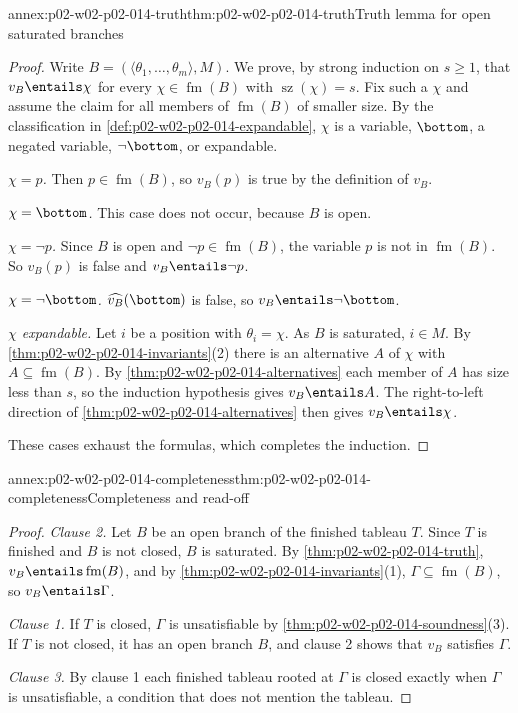 \begin{annexitem}{annex:p02-w02-p02-014-truth}{thm:p02-w02-p02-014-truth}{Truth lemma for open saturated branches}
\begin{proof}
Write \(B=(\langle\theta_1,\ldots,\theta_m\rangle,M)\).  We prove, by strong
induction on \(s\geq1\), that \(v_B\entails\chi\) for every \(\chi\in\operatorname{fm}(B)\)
with \(\operatorname{sz}(\chi)=s\).  Fix such a \(\chi\) and assume the claim
for all members of \(\operatorname{fm}(B)\) of smaller size.  By the classification in
\cref{def:p02-w02-p02-014-expandable}, \(\chi\) is a variable, \(\bottom\),
a negated variable, \(\neg\bottom\), or expandable.

\emph{\(\chi=p\).}  Then \(p\in\operatorname{fm}(B)\), so \(v_B(p)\) is true by the
definition of \(v_B\).

\emph{\(\chi=\bottom\).}  This case does not occur, because \(B\) is open.

\emph{\(\chi=\neg p\).}  Since \(B\) is open and \(\neg p\in\operatorname{fm}(B)\), the
variable \(p\) is not in \(\operatorname{fm}(B)\).  So \(v_B(p)\) is false and
\(v_B\entails\neg p\).

\emph{\(\chi=\neg\bottom\).}  \(\widehat{v_B}(\bottom)\) is false, so
\(v_B\entails\neg\bottom\).

\emph{\(\chi\) expandable.}  Let \(i\) be a position with
\(\theta_i=\chi\).  As \(B\) is saturated, \(i\in M\).  By
\cref{thm:p02-w02-p02-014-invariants}(2) there is an alternative \(A\) of
\(\chi\) with \(A\subseteq\operatorname{fm}(B)\).  By
\cref{thm:p02-w02-p02-014-alternatives} each member of \(A\) has size less
than \(s\), so the induction hypothesis gives \(v_B\entails A\).  The
right-to-left direction of \cref{thm:p02-w02-p02-014-alternatives} then gives
\(v_B\entails\chi\).

These cases exhaust the formulas, which completes the induction.
\end{proof}
\end{annexitem}

\begin{annexitem}{annex:p02-w02-p02-014-completeness}{thm:p02-w02-p02-014-completeness}{Completeness and read-off}
\begin{proof}
\emph{Clause 2.}  Let \(B\) be an open branch of the finished tableau \(T\).
Since \(T\) is finished and \(B\) is not closed, \(B\) is saturated.  By
\cref{thm:p02-w02-p02-014-truth}, \(v_B\entails\operatorname{fm}(B)\), and by
\cref{thm:p02-w02-p02-014-invariants}(1), \(\Gamma\subseteq\operatorname{fm}(B)\), so
\(v_B\entails\Gamma\).

\emph{Clause 1.}  If \(T\) is closed, \(\Gamma\) is unsatisfiable by
\cref{thm:p02-w02-p02-014-soundness}(3).  If \(T\) is not closed, it has an
open branch \(B\), and clause 2 shows that \(v_B\) satisfies \(\Gamma\).

\emph{Clause 3.}  By clause 1 each finished tableau rooted at \(\Gamma\) is
closed exactly when \(\Gamma\) is unsatisfiable, a condition that does not
mention the tableau.
\end{proof}
\end{annexitem}

